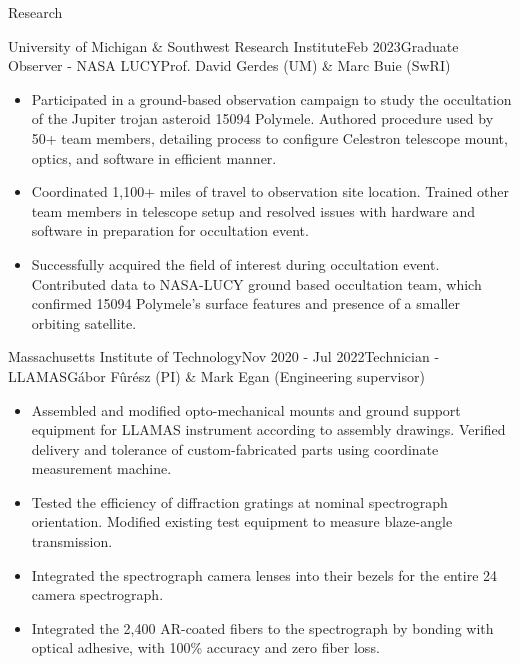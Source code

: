 \documentclass{resume} %
\begin{document}
\begin{rSection}{Research}
\begin{rSubsection}{University of Michigan \& Southwest Research Institute}{Feb 2023}{Graduate Observer - NASA LUCY}{Prof. David Gerdes (UM) \& Marc Buie (SwRI)}
\begin{itemize}
    \item Participated in a ground-based observation campaign to study the occultation of the Jupiter trojan asteroid 15094 Polymele. Authored procedure used by 50+ team members, detailing process to configure Celestron telescope mount, optics, and software in efficient manner.
    \item Coordinated 1,100+ miles of travel to observation site location. Trained other team members in telescope setup and resolved issues with hardware and software in preparation for occultation event.
    \item Successfully acquired the field of interest during occultation event. Contributed data to NASA-LUCY ground based occultation team, which confirmed 15094 Polymele's surface features and presence of a smaller orbiting satellite.
\end{itemize}
\end{rSubsection}



\begin{rSubsection}{Massachusetts Institute of Technology}{Nov 2020 - Jul 2022}{Technician - LLAMAS}{G\'abor F\^ur\'esz (PI) \& Mark Egan (Engineering supervisor)}
\begin{itemize}
\item Assembled and modified opto-mechanical mounts and ground support equipment for \ac{LLAMAS} instrument according to assembly drawings. Verified delivery and tolerance of custom-fabricated parts using coordinate measurement machine.
\item Tested the efficiency of diffraction gratings at nominal spectrograph orientation. Modified existing test equipment to measure blaze-angle transmission. 
\item Integrated the spectrograph camera lenses into their bezels for the entire 24 camera spectrograph.
\item Integrated the 2,400 AR-coated fibers to the spectrograph by bonding with optical adhesive, with 100\% accuracy and zero fiber loss.
\end{itemize}
\end{rSubsection}


\end{rSection}
\end{document}
